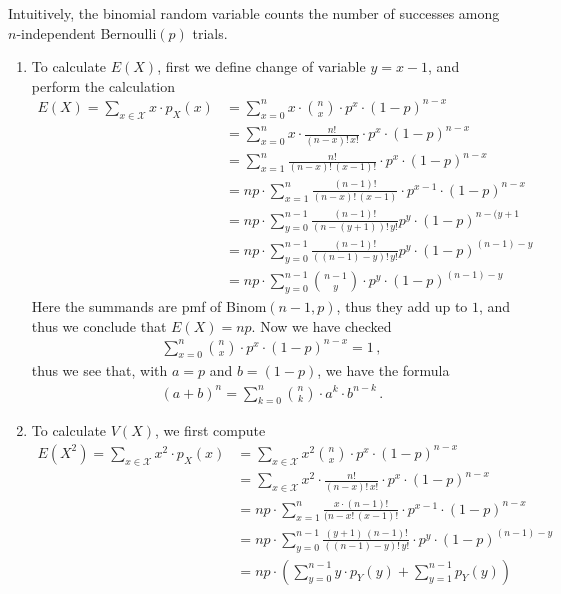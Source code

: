 \documentclass[11pt,oneside]{book}
\theoremstyle{newStyle}
\begin{document}
Intuitively, the binomial random variable counts the number of successes among $n$-independent Bernoulli$(p)$ trials. \\

\begin{enumerate}
\item To calculate $E(X)$, first we define change of variable $y= x-1$, and perform the calculation
\begin{align*}
E(X) = \sum_{x \in \mathcal{X}} x\cdot p_X(x) &= \sum_{x=0}^n x\cdot \binom{n}{x} \cdot p^x \cdot (1-p)^{n-x}\\
&= \sum_{x=0}^n x\cdot \frac{n!}{(n-x)!\, x!} \cdot p^x \cdot (1-p)^{n-x}\\
&= \sum_{x=1}^n \frac{n!}{(n-x)!\, (x-1)!}\cdot p^x \cdot (1-p)^{n-x}\\
&= np \cdot \sum_{x=1}^n \frac{(n-1)!}{(n-x)!\, (x-1)}\cdot p^{x-1}\cdot (1-p)^{n-x}\\
&= np\cdot \sum_{y=0}^{n-1}\frac{(n-1)!}{(n-(y+1))!\, y!} p^y \cdot (1-p)^{n-(y+1}\\
&= np \cdot \sum_{y=0}^{n-1}\frac{(n-1)!}{((n-1)-y)!\, y!}p^y\cdot (1-p)^{(n-1)-y}\\
&= np \cdot \sum_{y=0}^{n-1} \binom{n-1}{y} \cdot p^y \cdot (1-p)^{(n-1)-y}
\end{align*}
Here the summands are pmf of Binom$(n-1,p)$, thus they add up to $1$, and thus we conclude that $E(X) = np$. Now we have checked
\begin{align*}
\sum_{x=0}^n \binom{n}{x} \cdot p^x\cdot (1-p)^{n-x} = 1\,,
\end{align*} 
thus we see that, with $a= p$ and $b = (1-p)$, we have the formula
\begin{align*}
(a+b)^n = \sum_{k=0}^n \binom{n}{k} \cdot a^k\cdot b^{n-k}\,.
\end{align*} 
\item To calculate $V(X)$, we first compute
\begin{align*}
E(X^2) = \sum_{x\in \mathcal{X}} x^2\cdot p_X(x) &= \sum_{x\in \mathcal{X}}x^2\binom{n}{x} \cdot p^x \cdot (1-p)^{n-x}\\
&= \sum_{x \in \mathcal{X}} x^2 \cdot \frac{n!}{(n-x)!\, x!} \cdot p^x \cdot (1-p)^{n-x}\\
&= np \cdot \sum_{x=1}^n \frac{x \cdot (n-1)!}{(n-x!\, (x-1)!}\cdot p^{x-1}\cdot (1-p)^{n-x}\\
&= np \cdot \sum_{y=0}^{n-1} \frac{(y+1)\, (n-1)!}{((n-1)-y)!\, y!} \cdot p^y \cdot (1-p)^{(n-1)-y}\\
&= np\cdot \left( \sum_{y=0}^{n-1} y\cdot p_Y(y) + \sum_{y=1}^{n-1} p_Y(y) \right)\\

\end{align*}
\end{enumerate}
\end{document}
